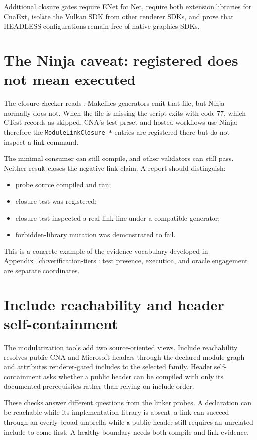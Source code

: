 Additional closure gates require ENet for Net, require both extension libraries for CnaExt, isolate
the Vulkan SDK from other renderer SDKs, and prove that HEADLESS configurations remain free of
native graphics SDKs.

\section{The Ninja caveat: registered does not mean executed}

The closure checker reads
.  Makefiles generators emit that file, but Ninja normally
does not.  When the file is missing the script exits with code 77, which CTest records as skipped.
CNA's test preset and hosted workflows use Ninja; therefore the \texttt{ModuleLinkClosure\_*}
entries are registered there but do not inspect a link command.

The minimal consumer can still compile, and other validators can still pass.  Neither result closes
the negative-link claim.  A report should distinguish:

\begin{itemize}
  \item probe source compiled and ran;
  \item closure test was registered;
  \item closure test inspected a real link line under a compatible generator;
  \item forbidden-library mutation was demonstrated to fail.
\end{itemize}

This is a concrete example of the evidence vocabulary developed in
Appendix~\ref{ch:verification-tiers}: test presence, execution, and oracle engagement are separate
coordinates.

\section{Include reachability and header self-containment}

The modularization tools add two source-oriented views.  Include reachability resolves public CNA
and Microsoft headers through the declared module graph and
attributes renderer-gated includes to the selected family.  Header self-containment asks whether a
public header can be compiled with only its documented prerequisites rather than relying on
include order.

These checks answer different questions from the linker probes.  A declaration can be reachable
while its implementation library is absent; a link can succeed through an overly broad umbrella
while a public header still requires an unrelated include to come first.  A healthy boundary needs
both compile and link evidence.

